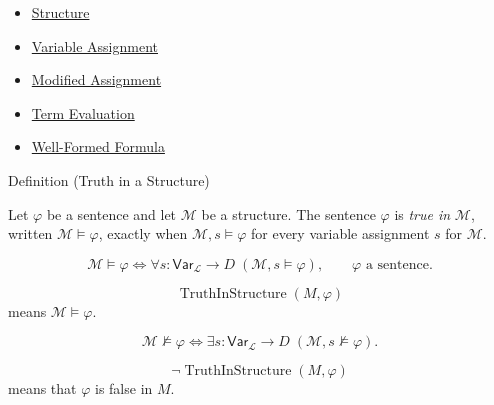 \begin{dependencies}
\begin{itemize}
  \item \hyperref[def:structure]{Structure}
  \item \hyperref[def:var-assign]{Variable Assignment}
  \item \hyperref[def:mod-assign]{Modified Assignment}
  \item \hyperref[def:term-interp]{Term Evaluation}
  \item \hyperref[def:wff-pred]{Well-Formed Formula}
\end{itemize}
\end{dependencies}

\begin{definitionbox}{Definition (Truth in a Structure)}
\begin{definition}
\label{def:truth-structure}
Let \(\varphi\) be a sentence and let \(\mathcal M\) be a structure. The
sentence \(\varphi\) is \emph{true in} \(\mathcal M\), written
\(\mathcal M\models\varphi\), exactly when
\(\mathcal M,s\models\varphi\) for every variable assignment \(s\) for
\(\mathcal M\).
\end{definition}
\end{definitionbox}

\begin{remark*}
\[
\mathcal M\models\varphi
\Longleftrightarrow
\forall s:\mathsf{Var}_{\mathcal L}\to D\;(\mathcal M,s\models\varphi),
\qquad
\varphi \text{ a sentence.}
\]
\end{remark*}

\begin{remark*}
\[
  \operatorname{TruthInStructure}(M,\varphi)
\] means
\(\mathcal M\models\varphi\).
\end{remark*}

\begin{remark*}
\[
\mathcal M\not\models\varphi
\Longleftrightarrow
\exists s:\mathsf{Var}_{\mathcal L}\to D\;(\mathcal M,s\not\models\varphi).
\]
\end{remark*}

\begin{remark*}
\[
  \neg\operatorname{TruthInStructure}(M,\varphi)
\] means that \(\varphi\) is
false in \(M\).
\end{remark*}

